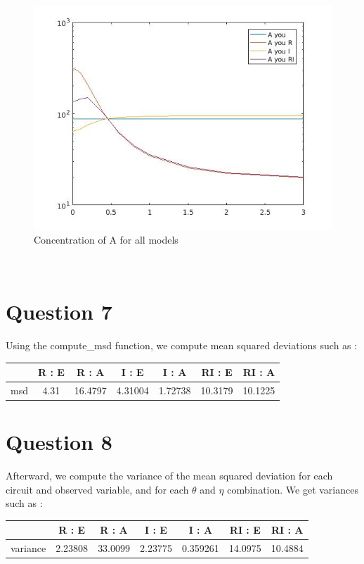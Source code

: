 \documentclass[11pt,a4paper]{report}
\begin{document}
\begin{figure}[!ht]
  \begin{center}
    \includegraphics[width=0.7\linewidth]{Figure7.jpg}
    \caption{Concentration of A for all models}
    \label{q6-A}
  \end{center}
\end{figure}
~\\
\newpage
\section*{Question 7}

Using the compute\_msd function, we compute mean squared deviations such as :\\
\begin{center}
\begin{tabular}{|c|c|c||c|c||c|c|}
  \hline
  ~ & R : E & R : A & I : E & I : A & RI : E & RI : A\\
  \hline
  msd & 4.31 & 16.4797 & 4.31004 & 1.72738 & 10.3179 & 10.1225\\
  \hline
\end{tabular}
\end{center}

\section*{Question 8}

Afterward, we compute the variance of the mean squared deviation for each circuit and observed variable, and for each $\theta$ and $\eta$ combination. We get variances such as :\\

\begin{center}
\begin{tabular}{|c|c|c||c|c||c|c|}
  \hline
  ~ & R : E & R : A & I : E & I : A & RI : E & RI : A\\
  \hline
  variance & 2.23808 & 33.0099 & 2.23775 & 0.359261 & 14.0975 & 10.4884\\
  \hline
\end{tabular}
\end{center}
~\\
\end{document}
